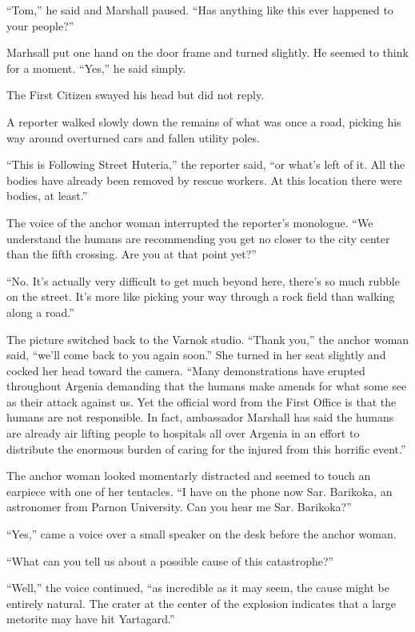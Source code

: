 ``Tom,'' he said and Marshall paused. ``Has anything like this ever happened to your people?''

Marhsall put one hand on the door frame and turned slightly. He seemed to think for a moment.
``Yes,'' he said simply.

The First Citizen swayed his head but did not reply.

\spacebreak

A reporter walked slowly down the remains of what was once a road, picking his way around
overturned cars and fallen utility poles.

``This is Following Street Huteria,'' the reporter said, ``or what's left of it. All the bodies
have already been removed by rescue workers. At this location there were bodies, at least.''

The voice of the anchor woman interrupted the reporter's monologue. ``We understand the humans
are recommending you get no closer to the city center than the fifth crossing. Are you at that
point yet?''

``No. It's actually very difficult to get much beyond here, there's so much rubble on the
street. It's more like picking your way through a rock field than walking along a road.''

The picture switched back to the Varnok studio. ``Thank you,'' the anchor woman said, ``we'll
come back to you again soon.'' She turned in her seat slightly and cocked her head toward the
camera. ``Many demonstrations have erupted throughout Argenia demanding that the humans make
amends for what some see as their attack against us. Yet the official word from the First Office
is that the humans are not responsible. In fact, ambassador Marshall has said the humans are
already air lifting people to hospitals all over Argenia in an effort to distribute the enormous
burden of caring for the injured from this horrific event.''


The anchor woman looked momentarly distracted and seemed to touch an earpiece with one of her
tentacles. ``I have on the phone now Sar. Barikoka, an astronomer from Parnon University.
Can you hear me Sar. Barikoka?''

``Yes,'' came a voice over a small speaker on the desk before the anchor woman.

``What can you tell us about a possible cause of this catastrophe?''

``Well,'' the voice continued, ``as incredible as it may seem, the cause might be entirely
natural. The crater at the center of the explosion indicates that a large metorite may have hit
Yartagard.''

